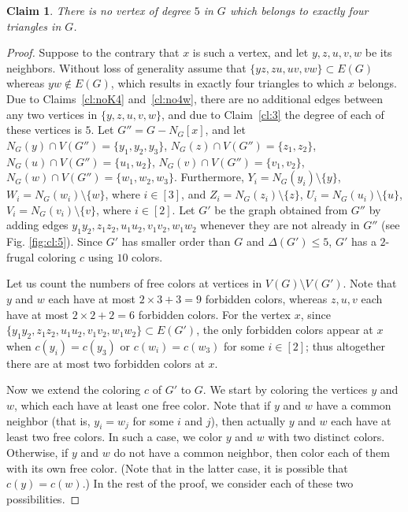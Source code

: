 \documentclass[11pt]{article}
\newtheorem{claim}{Claim}
\begin{document}
\begin{claim} There is no vertex of degree $5$ in $G$ which belongs to exactly four triangles in $G$.
\label{cl:5}
\end{claim} 
\begin{proof}
Suppose to the contrary that $x$ is such a vertex, and let $y,z,u,v, w$ be its neighbors. Without loss of generality assume that   $\{yz,zu,uv,vw\}\subset E(G)$ whereas $yw\notin E(G)$, which results in exactly four triangles to which $x$ belongs. Due to Claims~\ref{cl:noK4} and~\ref{cl:no4w}, there are no additional edges between any two vertices in $\{y,z,u,v,w\}$, and due to Claim~\ref{cl:3} the degree of each of these vertices is $5$. Let $G''=G-N_G[x]$,  and let $N_G(y)\cap V(G'')=\{y_1,y_2,y_3\}$,  $N_G(z)\cap V(G'')=\{z_1,z_2\}$, $N_G(u)\cap V(G'')=\{u_1,u_2\}$, $N_G(v)\cap V(G'')=\{v_1,v_2\}$, $N_G(w)\cap V(G'')=\{w_1,w_2,w_3\}$. Furthermore, $Y_i =N_G(y_i)\setminus\{y\}$, $W_i =N_G(w_i)\setminus\{w\}$, where $i\in[3]$, and $Z_i =N_G(z_i)\setminus\{z\}$, $U_i =N_G(u_i)\setminus\{u\}$, $V_i =N_G(v_i)\setminus\{v\}$, where $i\in [2]$. 
Let $G'$ be the graph obtained from $G''$ by adding edges $y_1y_2,z_1z_2,u_1u_2,v_1v_2, w_1w_2$ whenever they are not already in $G''$ (see Fig. \ref{fig:cl:5}). Since $G'$ has smaller order than $G$ and $\Delta(G')\le 5$, $G'$ has a $2$-frugal coloring $c$ using $10$ colors.

Let us count the numbers of free colors at vertices in $V(G)\setminus V(G')$. Note that $y$ and $w$ each have at most 
$2\times 3+ 3=9$ forbidden colors, whereas $z,u,v$ each have at most  $2\times 2+2=6$ forbidden colors. For the vertex $x$, since $\{y_1y_2,z_1z_2,u_1u_2,v_1v_2,w_1w_2\}\subset E(G')$, the only forbidden colors appear at $x$ when $c(y_i)=c(y_3)$ or $c(w_i)=c(w_3)$ for some $i\in [2]$; thus altogether there are at most two forbidden colors at $x$. 

Now we extend the coloring $c$ of $G'$ to $G$. We start by coloring the vertices $y$ and $w$, which each have at least one free color. Note that if $y$ and $w$ have a common neighbor (that is, $y_i=w_j$ for some $i$ and $j$), then actually $y$ and $w$ each have at least two free colors. In such a case, we color $y$ and $w$ with two distinct colors. Otherwise, if $y$ and $w$ do not have a common neighbor, then color each of them with its own free color. (Note that in the latter case, it is possible that $c(y)=c(w)$.)
In the rest of the proof, we consider each of these two possibilities.


\end{proof}
\end{document}
